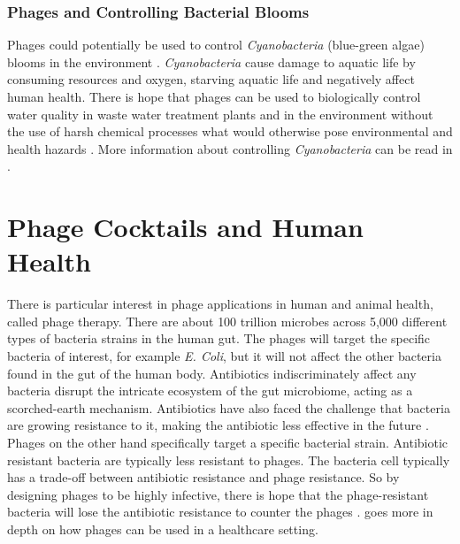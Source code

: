 \subsubsection{Phages and Controlling Bacterial Blooms}
Phages could potentially be used to control \textit{Cyanobacteria} (blue-green algae) blooms in the environment \cite{colomaFrequencyVirusresistantHosts2019}. 
\textit{Cyanobacteria} cause damage to aquatic life by consuming resources and oxygen, starving aquatic life and negatively affect human health. 
There is hope that phages can be used to biologically control water quality in waste water treatment plants and in the environment without the use of harsh chemical processes what would otherwise pose environmental and health hazards \cite{krysiak-baltynSimulationPhageDynamics2017, tuckerIdentificationCyanophageMaLBP2005}. 
More information about controlling \textit{Cyanobacteria} can be read in . 

\section{Phage Cocktails and Human Health}
There is particular interest in phage applications in human and animal health, called phage therapy. 
There are about 100 trillion microbes across 5,000 different types of bacteria strains in the human gut. 
The phages will target the specific bacteria of interest, for example \textit{E. Coli}, but it will not affect the other bacteria found in the gut of the human body. 
Antibiotics indiscriminately affect any bacteria disrupt the intricate ecosystem of the gut microbiome, acting as a scorched-earth mechanism. 
Antibiotics have also faced the challenge that bacteria are growing resistance to it, making the antibiotic less effective in the future \cite{odonkorBacteriaResistanceAntibiotics2011, volkovaEffectsEarlylifePenicillin2021}. 
Phages on the other hand specifically target a specific bacterial strain. 
Antibiotic resistant bacteria are typically less resistant to phages. 
The bacteria cell typically has a trade-off between antibiotic resistance and phage resistance. 
So by designing phages to be highly infective, there is hope that the phage-resistant bacteria will lose the antibiotic resistance to counter the phages \cite{laurePhageResistancemediatedTradeoffs2022, zhaoPhagedrivenCoevolutionReveals2024}. 
 goes more in depth on how phages can be used in a healthcare setting. 

